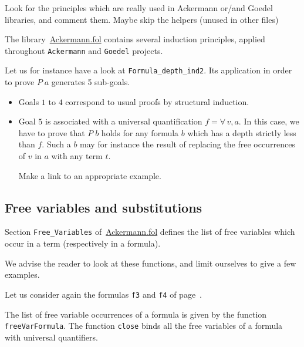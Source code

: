 
\begin{todo}
 Look for the principles which are really used in Ackermann or/and Goedel libraries, and comment them.
 Maybe skip the helpers (unused in other files)
\end{todo}

The library~\href{../theories/html/hydras.Ackermann.fol.html}{Ackermann.fol} contains several induction principles, applied 
throughout \texttt{Ackermann} and \texttt{Goedel} projects.


Let us for instance have a look  at \texttt{Formula\_depth\_ind2}. Its application in order to prove $P\;a$ generates 5 sub-goals. 


\begin{itemize}
\item Goals $1$ to $4$ correspond to  usual proofs by structural induction.
\item Goal $5$ is associated with a universal quantification $f=\forall\,v,a$. In this case, we have to prove that $P\;b$ holds for any formula $b$ which has a depth strictly less than $f$. Such a $b$ may for instance the result of replacing the free occurrences of $v$ in $a$ with any term $t$.
  \begin{todo}
   Make a link to an appropriate example.
  \end{todo}
\end{itemize}



\subsection{Free variables and substitutions}

Section \texttt{Free\_Variables} 
of~\href{../theories/html/hydras.Ackermann.fol.html}{Ackermann.fol} defines the list of free variables which occur in a term (respectively in a formula).

We advise the reader to look at these functions, and limit ourselves to give a few examples.

Let us consider again the formulas \texttt{f3} and \texttt{f4} of page~\pageref{fol:examplesf1f2f3}.

The list of free variable occurrences of a formula is given by the function \texttt{freeVarFormula}. The function \texttt{close}
binds all the free variables of a formula with universal quantifiers.

